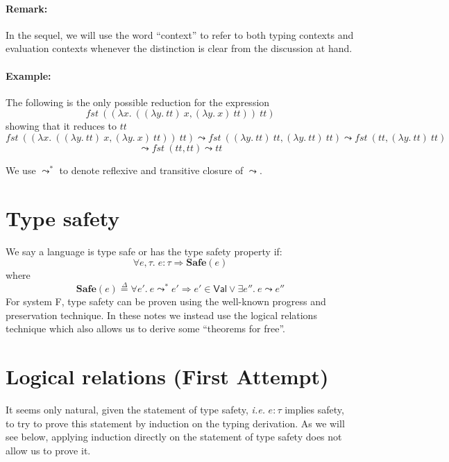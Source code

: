 \documentclass{article}
\newcommand{\ie}{\textit{i.e.}}
\newcommand{\fst}{\mathit{fst}}
\newcommand{\TT}{\mathit{tt}}
\newcommand{\VAL}{\mathsf{Val}}
\newcommand{\defeq}{\overset{\Delta}{=}}
\newcommand{\expr}{e}
\newcommand{\var}{x}
\newcommand{\varB}{y}
\newcommand{\typ}{\tau}
\newcommand{\step}{\leadsto}
\newcommand{\steps}{\leadsto^*}
\begin{document}
\paragraph{Remark:} In the sequel, we will use the word ``context''
to refer to both typing contexts and evaluation contexts whenever
the distinction is clear from the discussion at hand.

\paragraph{Example:} The following is the only possible reduction for the expression
\[\fst~((\lambda \var.~((\lambda \varB.~ \TT)~\var, (\lambda \varB.~ \var)~\TT))~\TT)\]
showing that it reduces to $\TT$
\[
\fst~((\lambda \var.~((\lambda \varB.~ \TT)~\var, (\lambda \varB.~ \var)~\TT))~\TT) \step
\fst~((\lambda \varB.~ \TT)~\TT, (\lambda \varB.~ \TT)~\TT) \step
\fst~(\TT, (\lambda \varB.~ \TT)~\TT)
\]
\[
\step \fst~(\TT, \TT) \step \TT
\]


We use $\steps$ to denote reflexive and transitive closure of $\step$.

\section{Type safety}
We say a language is type safe or has the type safety property if:
\[
\forall \expr, \typ.\; \expr : \typ \Rightarrow \mathbf{Safe}(\expr)
\]
where
\[
\mathbf{Safe}(\expr) \defeq \forall \expr'.~ \expr \steps \expr'
\Rightarrow \expr' \in \VAL \lor \exists \expr''.~\expr\step \expr''
\]
For system F, type safety can be proven using the well-known progress and preservation technique. In these notes we instead use the logical relations technique which also allows us to derive some ``theorems for free''.

\section{Logical relations (First Attempt)}
It seems only natural, given the statement of type safety, \ie{} $\expr : \typ$ implies safety, to try to prove this statement by induction on the typing derivation.
As we will see below, applying induction directly on the statement of type safety does not allow us to prove it.
\end{document}
